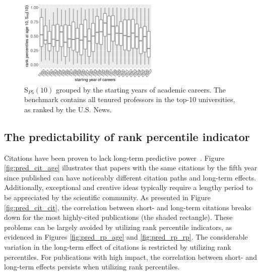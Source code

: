 \begin{figure}[ht!]
    \centering
    \includegraphics[width=0.6\textwidth]{figures/stationarity/rp_stationarity.eps}
    \caption[Stationarity of rank percentile indicators]{S$_{P5}(10)$ grouped by the starting years of academic careers. The benchmark contains all tenured professors in the top-10 universities, as ranked by the U.S. News.} 
    \label{fig:rp_stationarity}
\end{figure}

\subsection*{The predictability of rank percentile indicator}

Citations have been proven to lack long-term predictive power~\cite{Wang2013}. Figure \ref{fig:pred_cit_age} illustrates that papers with the same citations by the fifth year since published can have noticeably different citation paths and long-term effects. Additionally, exceptional and creative ideas typically require a lengthy period to be appreciated by the scientific community. As presented in Figure \ref{fig:pred_cit_cit}, the correlation between short- and long-term citations breaks down for the most highly-cited publications (the shaded rectangle). These problems can be largely avoided by utilizing rank percentile indicators, as evidenced in Figures \ref{fig:pred_rp_age} and \ref{fig:pred_rp_rp}. The considerable variation in the long-term effect of citations is restricted by utilizing rank percentiles. For publications with high impact, the correlation between short- and long-term effects persists when utilizing rank percentiles.

